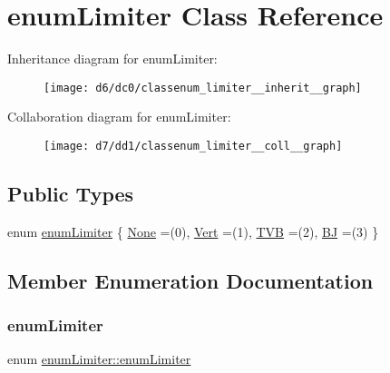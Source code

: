 \hypertarget{classenum_limiter}{}\section{enum\+Limiter Class Reference}
\label{classenum_limiter}


Inheritance diagram for enum\+Limiter\+:
\nopagebreak
\begin{figure}[H]
\begin{center}
\leavevmode
\texttt{[image: d6/dc0/classenum\_limiter\_\_inherit\_\_graph]}
\end{center}
\end{figure}


Collaboration diagram for enum\+Limiter\+:
\nopagebreak
\begin{figure}[H]
\begin{center}
\leavevmode
\texttt{[image: d7/dd1/classenum\_limiter\_\_coll\_\_graph]}
\end{center}
\end{figure}
\subsection*{Public Types}
\begin{DoxyCompactItemize}
\item 
enum \hyperlink{classenum_limiter_a7c5f278259a6102505ed88f51da57188}{enum\+Limiter} \{ \hyperlink{classenum_limiter_a7c5f278259a6102505ed88f51da57188a67f13f74620c34f80286bb8112e4c560}{None} =(0), 
\hyperlink{classenum_limiter_a7c5f278259a6102505ed88f51da57188af3db011a5485f07a532eb34c0ee198e7}{Vert} =(1), 
\hyperlink{classenum_limiter_a7c5f278259a6102505ed88f51da57188a5dee52b2406e06e9520e46c293924a04}{T\+VB} =(2), 
\hyperlink{classenum_limiter_a7c5f278259a6102505ed88f51da57188afef8c46891340f49708f33430dc74ab5}{BJ} =(3)
 \}
\end{DoxyCompactItemize}


\subsection{Member Enumeration Documentation}
\mbox{\label{classenum_limiter_a7c5f278259a6102505ed88f51da57188}} 
\subsubsection{\texorpdfstring{enum\+Limiter}{enumLimiter}}
{\footnotesize\ttfamily enum \hyperlink{classenum_limiter_a7c5f278259a6102505ed88f51da57188}{enum\+Limiter\+::enum\+Limiter}}

